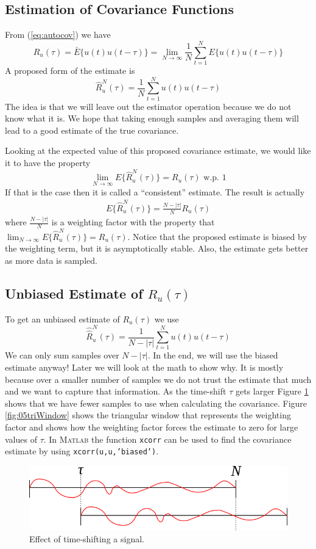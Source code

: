 \documentclass[lecture,12pt,]{pcms-l}
\theoremstyle{example}
\newcommand{\ruhat}{\hat{R}_u^N(\tau)}
\begin{document}
\subsection{Estimation of Covariance Functions}
From (\ref{eq:autocov}) we have
$$R_u(\tau) = \bar{E}\{u(t)u(t-\tau)\} = \lim_{N\to\infty}\frac{1}{N}\sum_{t=1}^N E\{u(t)u(t-\tau)\}$$
A proposed form of the estimate is
$$\hat{R}_u^N(\tau) = \frac{1}{N}\sum_{t=1}^Nu(t)u(t-\tau)$$
The idea is that we will leave out the estimator operation because we do not know what it is. We hope that taking enough samples and averaging them will lead to a good estimate of the true covariance.

Looking at the expected value of this proposed covariance estimate, we would like it to have the property
$$\lim_{N\to\infty} E\{\ruhat\} = R_u(\tau) \text{ w.p. } 1$$
If that is the case then it is called a ``consistent'' estimate. The result is actually
\begin{align}
\label{eq:autocovest}
E\{\ruhat\} = \frac{N-|\tau|}{N}R_u(\tau)
\end{align}
where $\frac{N-|\tau|}{N}$ is a weighting factor with the property that $\lim_{N\to\infty}E\{\ruhat\}=R_u(\tau)$. Notice that the proposed estimate is biased by the weighting term, but it is asymptotically stable. Also, the estimate gets better as more data is sampled.

\subsection{Unbiased Estimate of $R_u(\tau)$}
To get an unbiased estimate of $R_u(\tau)$ we use
$$\hat{\hat{R}}_u^N(\tau) = \frac{1}{N-|\tau|}\sum_{t=1}^Nu(t)u(t-\tau)$$
We can only sum samples over $N-|\tau|$. In the end, we will use the biased estimate anyway! Later we will look at the math to show why. It is mostly because over a smaller number of samples we do not trust the estimate that much and we want to capture that information. As the time-shift $\tau$ gets larger Figure \ref{fig:05timeShift} shows that we have fewer samples to use when calculating the covariance. Figure \ref{fig:05triWindow} shows the triangular window that represents the weighting factor and shows how the weighting factor forces the estimate to zero for large values of $\tau$. In \textsc{Matlab} the function \texttt{xcorr} can be used to find the covariance estimate by using \texttt{xcorr(u,u,'biased')}.
\begin{figure}[ht!]
	\centering
	\includegraphics[width=.6\textwidth]{images/05timeShift}
	\caption{Effect of time-shifting a signal.}
	\label{fig:05timeShift}
\end{figure}
\end{document}
